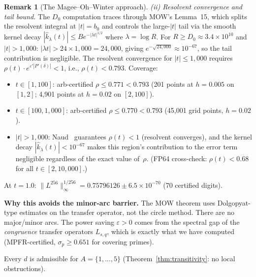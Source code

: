 \documentclass[11pt,a4paper]{amsart}
\theoremstyle{definition}
\newtheorem{remark}[theorem]{Remark}
\begin{document}
\begin{remark}[The Magee--Oh--Winter approach]
\emph{(ii) Resolvent convergence and tail bound.} The $D_0$ computation traces through MOW's Lemma~15, which splits the resolvent integral at $|t| = b_0$ and controls the large-$|t|$ tail via the smooth kernel decay $|\hat{k}_\lambda(t)| \leq B e^{-|\lambda t|^{1/2}}$ where $\lambda = \log R$. For $R \geq D_0 \approx 3.4 \times 10^{10}$ and $|t| > 1{,}000$: $|\lambda t| > 24 \times 1{,}000 = 24{,}000$, giving $e^{-\sqrt{24{,}000}} \approx 10^{-67}$, so the tail contribution is negligible. The resolvent convergence for $|t| \leq 1{,}000$ requires $\rho(t) \cdot e^{\varepsilon'|P'(\delta)|} < 1$, i.e., $\rho(t) < 0.793$. Coverage:
\begin{itemize}
\item $t \in [1, 100]$: arb-certified $\rho \leq 0.771 < 0.793$ (201 points at $h = 0.005$ on $[1,2]$; 4{,}901 points at $h = 0.02$ on $[2,100]$).
\item $t \in [100, 1{,}000]$: arb-certified $\rho \leq 0.770 < 0.793$ (45{,}001 grid points, $h = 0.02$).
\item $|t| > 1{,}000$: Naud~\cite{Naud2005} guarantees $\rho(t) < 1$ (resolvent converges), and the kernel decay $|\hat{k}_\lambda(t)| < 10^{-67}$ makes this region's contribution to the error term negligible regardless of the exact value of~$\rho$. (FP64 cross-check: $\rho(t) < 0.68$ for all $t \in [2, 10{,}000]$.)
\end{itemize}
At $t = 1.0$: $\|L^{256}\|_\infty^{1/256} = 0.75796126 \pm 6.5 \times 10^{-70}$ (70 certified digits).

\textbf{Why this avoids the minor-arc barrier.} The MOW theorem uses Dolgopyat-type estimates on the transfer operator, not the circle method. There are no major/minor arcs. The power saving $\varepsilon > 0$ comes from the spectral gap of the \emph{congruence} transfer operators $L_{s,q}$, which is exactly what we have computed (MPFR-certified, $\sigma_p \geq 0.651$ for covering primes).

Every $d$ is admissible for $A = \{1,\ldots,5\}$ (Theorem~\ref{thm:transitivity}: no local obstructions).
\end{remark}
\end{document}
